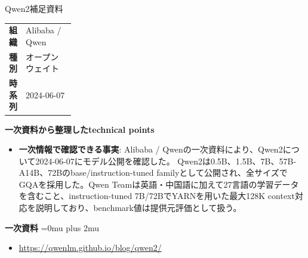 \Needspace{0.38\textheight}
\begin{technicalnote}{Qwen2}{補足資料}
\begingroup
\begin{tabularx}{\linewidth}{@{}>{\bfseries}p{0.22\linewidth}X@{}}
組織 & Alibaba / Qwen \\
種別 & オープンウェイト \\
時系列 & 2024-06-07 \\
\end{tabularx}
\smallskip
\begin{minipage}{\linewidth}
{\bfseries 一次資料から整理したtechnical points}
\begin{itemize}[leftmargin=1.5em,itemsep=0.35em]
\item \textbf{一次情報で確認できる事実}: Alibaba / Qwenの一次資料により、Qwen2について2024-06-07にモデル公開を確認した。 Qwen2は0.5B、1.5B、7B、57B-A14B、72Bのbase/instruction-tuned familyとして公開され、全サイズでGQAを採用した。Qwen Teamは英語・中国語に加えて27言語の学習データを含むこと、instruction-tuned 7B/72BでYARNを用いた最大128K context対応を説明しており、benchmark値は提供元評価として扱う。
\end{itemize}
\begin{minipage}{\linewidth}
\begin{samepage}
{\bfseries 一次資料}
\begingroup\sloppy
\Urlmuskip=0mu plus 2mu\relax
\begin{itemize}[leftmargin=1.5em,itemsep=0.25em]
\item {\scriptsize\url{https://qwenlm.github.io/blog/qwen2/}}
\end{itemize}
\endgroup
\end{samepage}
\end{minipage}
\end{minipage}
\endgroup
\end{technicalnote}
\medskip

